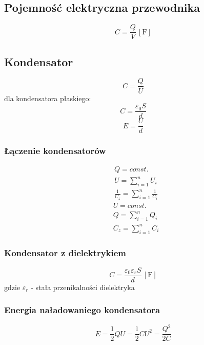 \documentclass{article}
\numberwithin{equation}{section}
\newcommand{\unit}[1]{\, \left[\mathrm{#1}\right]}
\begin{document}
    \subsection{Pojemność elektryczna przewodnika}
      \begin{equation}
        C = \frac{Q}{V} \unit{F}
      \end{equation}
    \subsection{Kondensator}
      \begin{equation}
        C= \frac{Q}{U}
      \end{equation}
      dla kondensatora płaskiego:
      \begin{equation}
        C= \frac{\varepsilon_0S}{d}
      \end{equation}
      \begin{equation}
        E = \frac{U}{d}
      \end{equation}
      \subsubsection{Łączenie kondensatorów}
        \begin{align}
          &Q = const.\\
          &U = \sum_{i=1}^n U_i\\
          &\frac{1}{C_z} = \sum_{i=1}^n \frac{1}{C_i}
        \end{align}
        \begin{align}
          &U = const.\\
          &Q = \sum_{i=1}^n Q_i\\
          &C_z = \sum_{i=1}^n C_i
        \end{align}
      \subsubsection{Kondensator z dielektrykiem}
      \begin{equation}
        C= \frac{\varepsilon_0\varepsilon_rS}{d} \unit{F}
      \end{equation}
      gdzie $\varepsilon_r$ - stała przenikalności dielektryka
      \subsubsection{Energia naładowaniego kondensatora}
        \begin{equation}
          E = \frac{1}{2}QU = \frac{1}{2}CU^2 = \frac{Q^2}{2C}
        \end{equation}
\end{document}
